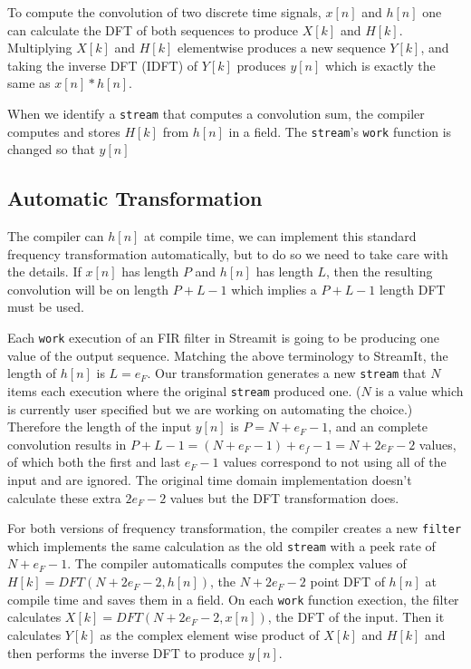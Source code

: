 To compute the convolution of two discrete time signals, $x[n]$ and $h[n]$ 
one can calculate the DFT of both sequences to produce 
$X[k]$ and $H[k]$. Multiplying $X[k]$ and $H[k]$ elementwise
produces a new sequence $Y[k]$, and taking the inverse DFT (IDFT) of $Y[k]$ 
produces $y[n]$ which is exactly the same as $x[n]*h[n]$.

When we identify a {\tt stream} that computes a convolution sum, the compiler
computes and stores $H[k]$ from $h[n]$ in a field. The {\tt stream}'s 
{\tt work} function is changed so that $y[n]$ 

\subsection{Automatic Transformation}

The compiler can  $h[n]$ at compile time, we can implement this standard frequency 
transformation automatically, but to do so we need to take care with the details.
If $x[n]$ has length $P$ and $h[n]$ has length $L$, then the resulting convolution
will be on length $P+L-1$ which implies a $P+L-1$ length DFT must be used.

Each {\tt work} execution of an FIR filter in Streamit is going to be 
producing one value of the output sequence. Matching the above terminology to StreamIt, 
the length of $h[n]$ is $L=e_F$. Our transformation generates a new {\tt stream} that
$N$ items each execution where the original {\tt stream} produced one. ($N$ is a value
which is currently user specified but we are working on automating the choice.)
Therefore the length of the input $y[n]$ is $P=N+e_F-1$, and an complete convolution results in 
$P+L-1=(N+e_F-1)+e_f-1=N+2e_F-2$ values, of which both the first and last $e_F-1$ values 
correspond to not using all of the input and are ignored. The original time domain 
implementation doesn't calculate these extra $2e_F-2$ values but the DFT transformation does.

For both versions of frequency transformation, the compiler creates a new {\tt filter} which
implements the same calculation as the old {\tt stream} with a peek rate of $N+e_F-1$.
The compiler automaticalls computes the complex values of $H[k]=DFT(N+2e_F-2,h[n])$, 
the $N+2e_F-2$  point DFT of $h[n]$ at compile time and saves them in a field. On each {\tt work}
function exection, the filter calculates $X[k]=DFT(N+2e_F-2,x[n])$, the DFT of the input.
Then it calculates $Y[k]$ as the complex element wise product of $X[k]$ and $H[k]$ and
then performs the inverse DFT to produce $y[n]$.

